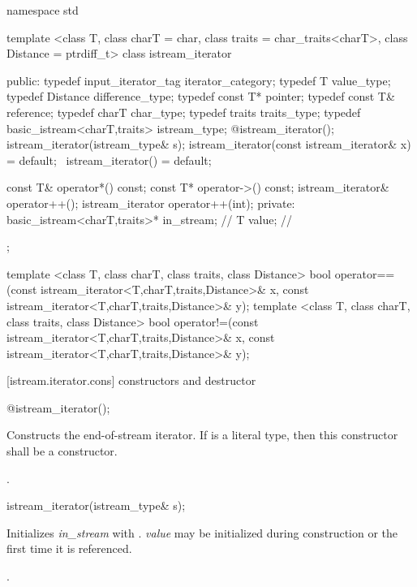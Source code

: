 \begin{codeblock}
namespace std {
  template <class T, class charT = char, class traits = char_traits<charT>,
      class Distance = ptrdiff_t>
  class istream_iterator {
  public:
    typedef input_iterator_tag iterator_category;
    typedef T value_type;
    typedef Distance difference_type;
    typedef const T* pointer;
    typedef const T& reference;
    typedef charT char_type;
    typedef traits traits_type;
    typedef basic_istream<charT,traits> istream_type;
    @\seebelow@ istream_iterator();
    istream_iterator(istream_type& s);
    istream_iterator(const istream_iterator& x) = default;
   ~istream_iterator() = default;

    const T& operator*() const;
    const T* operator->() const;
    istream_iterator& operator++();
    istream_iterator  operator++(int);
  private:
    basic_istream<charT,traits>* in_stream; // \expos
    T value;                                // \expos
  };

  template <class T, class charT, class traits, class Distance>
    bool operator==(const istream_iterator<T,charT,traits,Distance>& x,
            const istream_iterator<T,charT,traits,Distance>& y);
  template <class T, class charT, class traits, class Distance>
    bool operator!=(const istream_iterator<T,charT,traits,Distance>& x,
            const istream_iterator<T,charT,traits,Distance>& y);
}
\end{codeblock}

[istream.iterator.cons]{ constructors and destructor}


%
\begin{itemdecl}
@\seebelow@ istream_iterator();
\end{itemdecl}

\begin{itemdescr}
\pnum
\effects
Constructs the end-of-stream iterator. If  is a literal type, then this
constructor shall be a  constructor.

\pnum
\postcondition {}.
\end{itemdescr}


%
\begin{itemdecl}
istream_iterator(istream_type& s);
\end{itemdecl}

\begin{itemdescr}
\pnum
\effects
Initializes \textit{in_stream} with .
\textit{value} may be initialized during
construction or the first time it is referenced.

\pnum
\postcondition {}.
\end{itemdescr}


